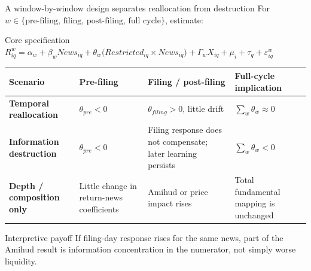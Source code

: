 \documentclass[aspectratio=169,10pt]{beamer}
\begin{document}
\begin{frame}[t]{A window-by-window design separates reallocation from destruction}
\footnotesize
For $w\in\{\text{pre-filing, filing, post-filing, full cycle}\}$, estimate:

\begin{block}{Core specification}
\centering
$R^{w}_{iq}=\alpha_w+\beta_w News_{iq}
+\theta_w\bigl(Restricted_{iq}\times News_{iq}\bigr)
+\Gamma_w X_{iq}+\mu_i+\tau_q+\varepsilon^{w}_{iq}$
\end{block}

\renewcommand{\arraystretch}{1.16}
\begin{tabularx}{\textwidth}{>{\bfseries\RaggedRight\arraybackslash}p{2.50cm} >{\RaggedRight\arraybackslash}X >{\RaggedRight\arraybackslash}X >{\RaggedRight\arraybackslash}X}
\toprule
Scenario & Pre-filing & Filing / post-filing & Full-cycle implication \\
\midrule
Temporal reallocation & $\theta_{pre}<0$ & $\theta_{filing}>0$, little drift & $\sum_w\theta_w\approx0$ \\
Information destruction & $\theta_{pre}<0$ & Filing response does not compensate; later learning persists & $\sum_w\theta_w<0$ \\
Depth / composition only & Little change in return-news coefficients & Amihud or price impact rises & Total fundamental mapping is unchanged \\
\bottomrule
\end{tabularx}

\begin{alertblock}{Interpretive payoff}
\scriptsize If filing-day response rises for the same news, part of the Amihud result is information concentration in the numerator, not simply worse liquidity.
\end{alertblock}
\end{frame}
\end{document}
